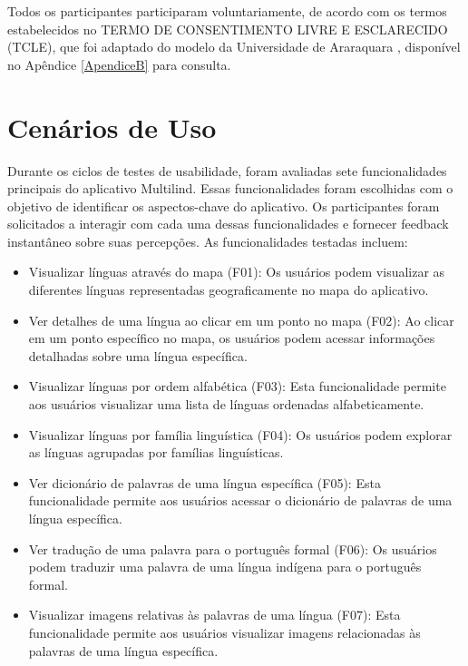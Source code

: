 Todos os participantes participaram voluntariamente, de acordo com os termos estabelecidos no  TERMO DE CONSENTIMENTO LIVRE E ESCLARECIDO (TCLE), que foi adaptado do modelo da Universidade de Araraquara \cite{tcle}, 
disponível no Apêndice \ref{ApendiceB} para consulta.

\section{Cenários de Uso}
\label{sec:Cenários de Uso}
Durante os ciclos de testes de usabilidade, foram avaliadas sete funcionalidades principais do aplicativo Multilind. Essas funcionalidades foram escolhidas com o objetivo de identificar os aspectos-chave do 
aplicativo. Os participantes foram solicitados a interagir com cada uma dessas funcionalidades e fornecer feedback instantâneo sobre suas percepções. As funcionalidades testadas incluem:

\begin{itemize}

	\item Visualizar línguas através do mapa (F01): Os usuários podem visualizar as diferentes línguas representadas geograficamente no mapa do aplicativo.

    \item Ver detalhes de uma língua ao clicar em um ponto no mapa (F02): Ao clicar em um ponto específico no mapa, os usuários podem acessar informações detalhadas sobre uma língua específica.
    
    \item Visualizar línguas por ordem alfabética (F03): Esta funcionalidade permite aos usuários visualizar uma lista de línguas ordenadas alfabeticamente.
    
    \item Visualizar línguas por família linguística (F04): Os usuários podem explorar as línguas agrupadas por famílias linguísticas.
    
    \item Ver dicionário de palavras de uma língua específica (F05): Esta funcionalidade permite aos usuários acessar o dicionário de palavras de uma língua específica.
    
    \item Ver tradução de uma palavra para o português formal (F06): Os usuários podem traduzir uma palavra de uma língua indígena para o português formal.
    
    \item  Visualizar imagens relativas às palavras de uma língua (F07): Esta funcionalidade permite aos usuários visualizar imagens relacionadas às palavras de uma língua específica.

\end{itemize}

